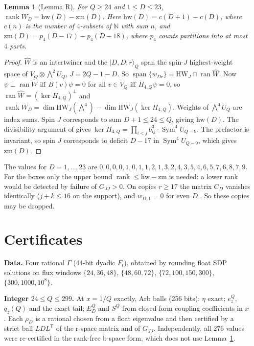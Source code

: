 \documentclass[11pt]{amsart}
\newtheorem{lemma}[theorem]{Lemma}
\theoremstyle{remark}
\newcommand{\Wh}{\widehat W}
\begin{document}
\begin{lemma}[Lemma R]\label{lem:R}
For $Q\ge24$ and $1\le D\le23$, $\operatorname{rank}W_D=\mathrm{hw}(D)-\mathrm{zm}(D)$. Here
$\mathrm{hw}(D)=c(D+1)-c(D)$, where $c(n)$ is the number of $4$-subsets of $\mathbb N$ with sum $n$, and
$\mathrm{zm}(D)=p_4(D-17)-p_4(D-18)$, where $p_4$ counts partitions into at most $4$ parts.
\end{lemma}
\begin{proof}
$\Wh$ is an intertwiner and the $|D,D;r\rangle_Q$ span the spin-$J$ highest-weight space of
$V_Q\otimes\bigwedge^2U_Q$, $J=2Q-1-D$. So $\operatorname{span}\{w_{Dr}\}=\mathrm{HW}_J\cap\operatorname{ran}\Wh$.
Now $\psi\perp\operatorname{ran}\Wh$ iff $B(v)\psi=0$ for all $v\in V_Q$ iff $H_{4,Q}\psi=0$, so
$\operatorname{ran}\Wh=(\ker H_{4,Q})^\perp$ and $\operatorname{rank}W_D=\dim\mathrm{HW}_J(\bigwedge^4)-\dim\mathrm{HW}_J(\ker H_{4,Q})$.
Weights of $\bigwedge^4U_Q$ are index sums. Spin $J$ corresponds to sum $D+1\le24\le Q$, giving $\mathrm{hw}(D)$.
The divisibility argument of \cite[Lemma~6.2]{OAI} gives
$\ker H_{4,Q}=\prod_{i<j}b_{ij}^3\cdot\operatorname{Sym}^4U_{Q-9}$. The prefactor is invariant, so spin $J$
corresponds to deficit $D-17$ in $\operatorname{Sym}^4U_{Q-9}$, which gives $\mathrm{zm}(D)$.
\end{proof}
The values for $D=1,\dots,23$ are $0,0,0,0,1,0,1,1,2,1,3,2,4,3,5,4,6,5,7,6,8,7,9$.
For the boxes only the upper bound $\operatorname{rank}\le\mathrm{hw}-\mathrm{zm}$ is needed: a lower rank would be detected by failure of $G_{JJ}>0$.
On copies $r\ge17$ the matrix $C_D$ vanishes identically ($j+k\le16$ on the support), and $w_{D,1}=0$ for even $D$
\cite[\S4]{OAI}. So these copies may be dropped.

\section{Certificates}
\textbf{Data.} Four rational $\Gamma$ (44-bit dyadic $F_t$), obtained by rounding float SDP solutions on
flux windows $\{24,36,48\}$, $\{48,60,72\}$, $\{72,100,150,300\}$, $\{300,1000,10^8\}$.

\textbf{Integer $24\le Q\le299$.} At $x=1/Q$ exactly, Arb balls (256 bits): $\eta$ exact; $e^Q_z$, $q_z(Q)$
and the exact tail; $E^Q_D$ and $S^Q$ from closed-form coupling coefficients in $x$. Each $\rho_D$ is a rational chosen
from a float eigenvalue and then certified by a strict ball $LDL^{\mathsf T}$ of the r-space matrix and of $G_{JJ}$.
Independently, all 276 values were re-certified in the rank-free b-space form, which does not use Lemma~\ref{lem:R}.
\end{document}
